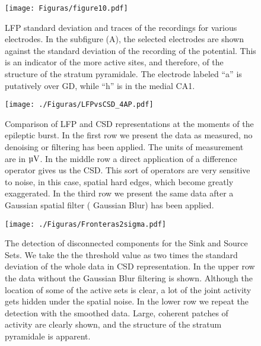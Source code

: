 
\begin{figure}[h!]
   \centering
   \texttt{[image: Figuras/figure10.pdf]}
    \caption{
      LFP standard deviation and traces of the recordings for various electrodes.
      In the subfigure (A), the selected electrodes
      are shown against the standard deviation of the recording of the
      potential. This is an indicator of the more active
      sites, and therefore, of the structure of the stratum pyramidale.
      The electrode labeled ``a'' is putatively over GD, while ``h''
      is in the medial CA1.}\label{traz4ap}
\end{figure}




\begin{figure}[h!]
   \captionsetup{singlelinecheck=off} 
  \texttt{[image: ./Figuras/LFPvsCSD\_4AP.pdf]}
  \caption[test]{
    Comparison of LFP and CSD representations
    at the moments of the epileptic burst. In the first row
    we present the data as measured, no denoising or filtering has
    been applied. The units of measurement are in $\SI{}{\micro\volt}$. In
    the middle row a direct application of a difference operator
    gives us the CSD. This sort of operators are very sensitive
    to noise, in this case, spatial hard edges, which become
    greatly exaggerated. In the third row we present the same
    data after a Gaussian spatial filter ( Gaussian Blur) has
    been applied. }\label{lfpycsd4ap}
\end{figure}



\begin{figure}[h!]
   \captionsetup{singlelinecheck=off} 
  \texttt{[image: ./Figuras/Fronteras2sigma.pdf]}
  \caption[test]
    {The detection of disconnected components for the Sink and Source
    Sets. We take the the threshold value as two times the
    standard deviation of the whole data in CSD representation. In
    the upper row the data without the Gaussian Blur filtering is shown.
    Although the location of some of the active sets is clear, a lot of the
    joint activity gets hidden under the spatial noise. In the lower
    row we repeat the detection with the smoothed data. Large, coherent
    patches of activity are clearly shown, and the structure of the
    stratum pyramidale is apparent. 
  }\label{csdfrontera}
\end{figure}


